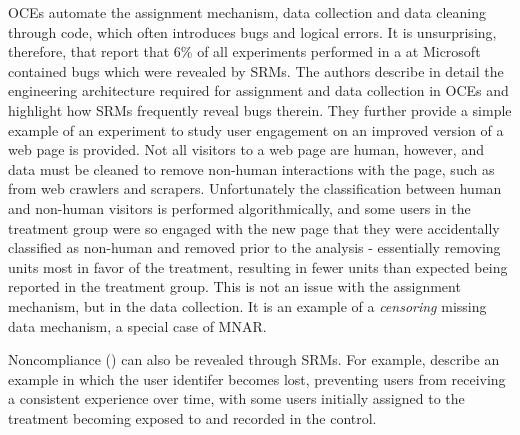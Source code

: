 \documentclass[11pt]{article}
\begin{document}
OCEs automate the assignment mechanism, data collection and data cleaning through code, which often introduces bugs and logical errors.
It is unsurprising, therefore, that \cite{fabijan} report that 6\% of all experiments performed in a at Microsoft contained bugs which were revealed by SRMs.
The authors describe in detail the engineering architecture required for assignment and data collection in OCEs and highlight how SRMs frequently reveal bugs therein.
They further provide a simple example of an experiment to study user engagement on an improved version of a web page is provided.
Not all visitors to a web page are human, however, and data must be cleaned to remove non-human interactions with the page, such as from web crawlers and scrapers.
Unfortunately the classification between human and non-human visitors is performed algorithmically, and some users in the treatment group were so engaged with the new page that they were accidentally classified as non-human and removed prior to the analysis - essentially removing units most in favor of the treatment, resulting in fewer units than expected being reported in the treatment group.
This is not an issue with the assignment mechanism, but in the data collection.
It is an example of a \textit{censoring} missing data mechanism, a special case of MNAR.

Noncompliance (\cite{imbens}) can also be revealed through SRMs. For example, \cite{zhao} describe an example in which the user identifer becomes lost, preventing users from receiving a consistent experience over time, with some users initially assigned to the treatment becoming exposed to and recorded in the control.
\end{document}
